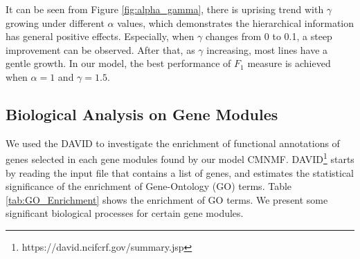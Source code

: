 \documentclass{bmcart}
\begin{document}
It can be seen from Figure \ref{fig:alpha_gamma}, there is uprising trend with $\gamma$ growing under different $\alpha$ values, which demonstrates the hierarchical information has general positive effects. Especially, when $\gamma$ changes from 0 to 0.1, a steep improvement can be observed. After that, as $\gamma$ increasing, most lines have a gentle growth. In our model, the best performance of $F_1$ measure is achieved when $\alpha=1$ and $\gamma = 1.5$.

\subsection*{\textbf{Biological Analysis on Gene Modules}}%

We used the DAVID\cite{Dennis2003} to investigate the enrichment of functional annotations of genes selected in each gene modules found by our model CMNMF. DAVID\footnote{https://david.ncifcrf.gov/summary.jsp} starts by reading the input file that contains a list of genes, and estimates the statistical significance of the enrichment of Gene-Ontology (GO) terms.
Table \ref{tab:GO_Enrichment} shows the enrichment of GO terms. We present some significant biological processes for certain  gene modules.
\end{document}
